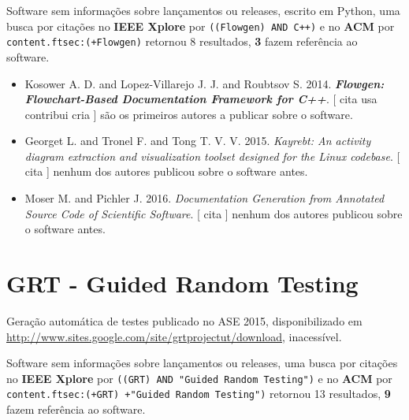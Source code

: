 Software sem informações sobre lançamentos ou releases,
escrito em Python,
uma busca por citações no {\bf IEEE Xplore} por
\texttt{((Flowgen) AND C++)}
e no {\bf ACM} por
\texttt{content.ftsec:(+Flowgen)}
retornou
8 resultados,
{\bf 3} fazem referência ao software.

\begin{itemize}
\item Kosower A. D. and Lopez-Villarejo J. J. and Roubtsov S.
      2014.
        \textbf{\textit{ Flowgen: Flowchart-Based Documentation Framework for C++}}.
      [
          cita
          usa
          contribui
          cria
      ]
são os primeiros autores a publicar sobre o software.
\item Georget L. and Tronel F. and Tong T. V. V.
      2015.
        \textit{ Kayrebt: An activity diagram extraction and visualization toolset designed for the Linux codebase}.
      [
          cita
      ]
nenhum dos autores publicou sobre o software antes.
\item Moser M. and Pichler J.
      2016.
        \textit{ Documentation Generation from Annotated Source Code of Scientific Software}.
      [
          cita
      ]
nenhum dos autores publicou sobre o software antes.
\end{itemize}
\section{GRT - Guided Random Testing}

Geração automática de testes
publicado no ASE 2015,
disponibilizado em \url{http://www.sites.google.com/site/grtprojectut/download},
inacessível.

Software sem informações sobre lançamentos ou releases,
uma busca por citações no {\bf IEEE Xplore} por
\texttt{((GRT) AND "Guided Random Testing")}
e no {\bf ACM} por
\texttt{content.ftsec:(+GRT) +"Guided Random Testing")}
retornou
13 resultados,
{\bf 9} fazem referência ao software.

